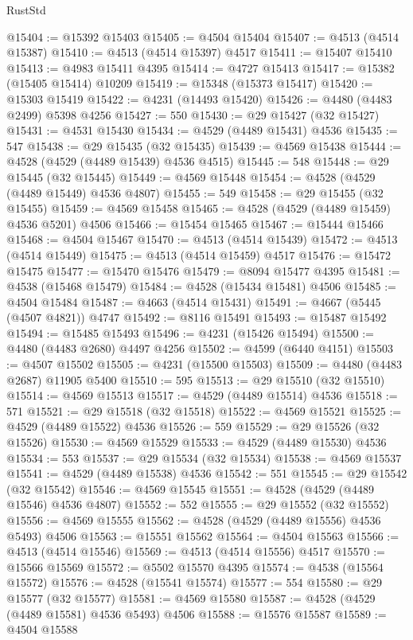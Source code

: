 \begin{lexlean}{RustStd}
\begin{coremodule}
@15404 := @15392 @15403
@15405 := @4504 @15404
@15407 := @4513 (@4514 @15387)
@15410 := @4513 (@4514 @15397) @4517
@15411 := @15407 @15410
@15413 := @4983 @15411 @4395
@15414 := @4727 @15413
@15417 := @15382 (@15405 @15414) @10209
@15419 := @15348 (@15373 @15417)
@15420 := @15303 @15419
@15422 := @4231 (@14493 @15420)
@15426 := @4480 (@4483 @2499) @5398 @4256
@15427 := 550
@15430 := @29 @15427 (@32 @15427)
@15431 := @4531 @15430
@15434 := @4529 (@4489 @15431) @4536
@15435 := 547
@15438 := @29 @15435 (@32 @15435)
@15439 := @4569 @15438
@15444 := @4528 (@4529 (@4489 @15439) @4536 @4515)
@15445 := 548
@15448 := @29 @15445 (@32 @15445)
@15449 := @4569 @15448
@15454 := @4528 (@4529 (@4489 @15449) @4536 @4807)
@15455 := 549
@15458 := @29 @15455 (@32 @15455)
@15459 := @4569 @15458
@15465 := @4528 (@4529 (@4489 @15459) @4536 @5201) @4506
@15466 := @15454 @15465
@15467 := @15444 @15466
@15468 := @4504 @15467
@15470 := @4513 (@4514 @15439)
@15472 := @4513 (@4514 @15449)
@15475 := @4513 (@4514 @15459) @4517
@15476 := @15472 @15475
@15477 := @15470 @15476
@15479 := @8094 @15477 @4395
@15481 := @4538 (@15468 @15479)
@15484 := @4528 (@15434 @15481) @4506
@15485 := @4504 @15484
@15487 := @4663 (@4514 @15431)
@15491 := @4667 (@5445 (@4507 @4821)) @4747
@15492 := @8116 @15491
@15493 := @15487 @15492
@15494 := @15485 @15493
@15496 := @4231 (@15426 @15494)
@15500 := @4480 (@4483 @2680) @4497 @4256
@15502 := @4599 (@6440 @4151)
@15503 := @4507 @15502
@15505 := @4231 (@15500 @15503)
@15509 := @4480 (@4483 @2687) @11905 @5400
@15510 := 595
@15513 := @29 @15510 (@32 @15510)
@15514 := @4569 @15513
@15517 := @4529 (@4489 @15514) @4536
@15518 := 571
@15521 := @29 @15518 (@32 @15518)
@15522 := @4569 @15521
@15525 := @4529 (@4489 @15522) @4536
@15526 := 559
@15529 := @29 @15526 (@32 @15526)
@15530 := @4569 @15529
@15533 := @4529 (@4489 @15530) @4536
@15534 := 553
@15537 := @29 @15534 (@32 @15534)
@15538 := @4569 @15537
@15541 := @4529 (@4489 @15538) @4536
@15542 := 551
@15545 := @29 @15542 (@32 @15542)
@15546 := @4569 @15545
@15551 := @4528 (@4529 (@4489 @15546) @4536 @4807)
@15552 := 552
@15555 := @29 @15552 (@32 @15552)
@15556 := @4569 @15555
@15562 := @4528 (@4529 (@4489 @15556) @4536 @5493) @4506
@15563 := @15551 @15562
@15564 := @4504 @15563
@15566 := @4513 (@4514 @15546)
@15569 := @4513 (@4514 @15556) @4517
@15570 := @15566 @15569
@15572 := @5502 @15570 @4395
@15574 := @4538 (@15564 @15572)
@15576 := @4528 (@15541 @15574)
@15577 := 554
@15580 := @29 @15577 (@32 @15577)
@15581 := @4569 @15580
@15587 := @4528 (@4529 (@4489 @15581) @4536 @5493) @4506
@15588 := @15576 @15587
@15589 := @4504 @15588

\end{coremodule}
\end{lexlean}
